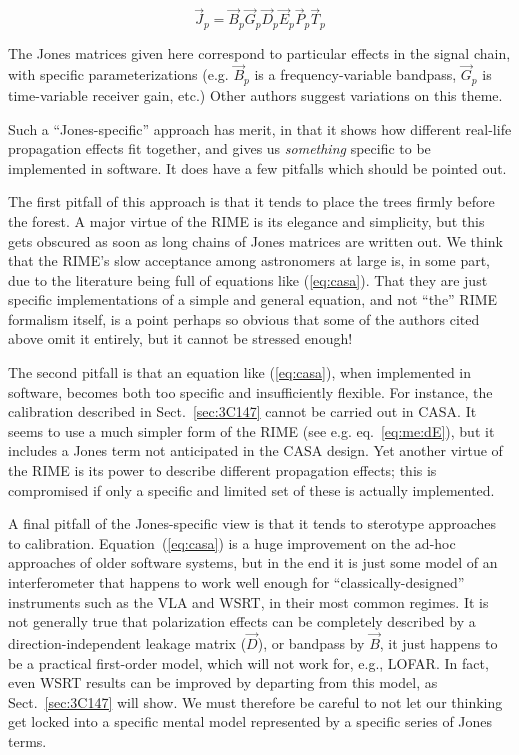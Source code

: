 \documentclass[]{aa}
\begin{document}
\begin{equation}\label{eq:casa}
\vec J_p = \vec B_p \vec G_p \vec D_p \vec E_p \vec P_p \vec  T_p
\end{equation}

The Jones matrices given here correspond to particular effects in the signal chain, with specific parameterizations (e.g. $\vec B_p$ is a frequency-variable bandpass, $\vec G_p$ is time-variable receiver gain, etc.) Other authors \citep{Rau:DDEs} suggest variations on this theme. 

Such a ``Jones-specific'' approach has merit, in that it shows how different real-life propagation effects fit together, and gives us {\em something} specific to be implemented in software. It does have a few pitfalls which should be pointed out.

The first pitfall of this approach is that it tends to place the trees firmly before the forest. A major virtue of the RIME is its elegance and simplicity, but this gets obscured as soon as long chains of Jones matrices are written out.  We think that the RIME's slow acceptance among astronomers at large is, in some part, due to the literature being full of equations like (\ref{eq:casa}). That they are just specific implementations of a simple and general equation, and not ``the'' RIME formalism itself, is a point perhaps so obvious that some of the authors cited above omit it entirely, but it cannot be stressed enough!

The second pitfall is that an equation like (\ref{eq:casa}), when implemented in software, becomes both too specific and insufficiently flexible. For instance, the calibration described in Sect.~\ref{sec:3C147} cannot be carried out in CASA. It seems to use a much simpler form of the RIME (see e.g. eq.~\ref{eq:me:dE}), but it includes a Jones term not anticipated in the CASA design. Yet another virtue of the RIME is its power to describe different propagation effects; this is compromised if only a specific and limited set of these is actually implemented.

A final pitfall of the Jones-specific view is that it tends to sterotype approaches to calibration. Equation~(\ref{eq:casa}) is a huge improvement on the ad-hoc approaches of older software systems, but in the end it is just some model of an interferometer that happens to work well enough for ``classically-designed'' instruments such as the VLA and WSRT, in their most common regimes. It is not generally true that polarization effects can be completely described by a direction-independent leakage matrix ($\vec D$), or bandpass by $\vec B$, it just happens to be a practical first-order model, which will not work for, e.g., LOFAR. In fact, even WSRT results can be improved by departing from this model, as Sect.~\ref{sec:3C147} will show. We must therefore be careful to not let our thinking get locked into a specific mental model represented by a specific series of Jones terms.
\end{document}
